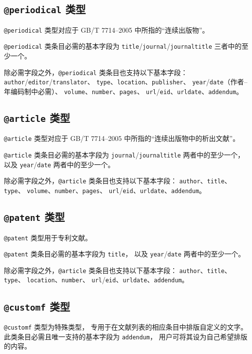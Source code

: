 \documentclass[UTF8]{ctexart}
\begin{document}
\subsection{\texttt{@periodical} 类型}

\verb|@periodical| 类型对应于 GB/T 7714--2005 中所指的“连续出版物”。

\verb|@periodical| 类条目必需的基本字段为
\verb|title|/\verb|journal|/\verb|journaltitle| 三者中的至少一个。

除必需字段之外，\verb|@periodical| 类条目也支持以下基本字段：%
\verb|author|/\verb|editor|/\verb|translator|、%
\verb|type|、\verb|location|、\verb|publisher|、%
\verb|year|/\verb|date|（作者--年编码制中必需）、%
\verb|volume|、\verb|number|、\verb|pages|、%
\verb|url|/\verb|eid|、\verb|urldate|、\verb|addendum|。

\subsection{\texttt{@article} 类型}

\verb|@article| 类型对应于 GB/T 7714--2005 中所指的“连续出版物中的析出文献”。

\verb|@article| 类条目必需的基本字段为
\verb|journal|/\verb|journaltitle| 两者中的至少一个，
以及 \verb|year|/\verb|date| 两者中的至少一个。

除必需字段之外，\verb|@article| 类条目也支持以下基本字段：%
\verb|author|、\verb|title|、\verb|type|、%
\verb|volume|、\verb|number|、\verb|pages|、%
\verb|url|/\verb|eid|、\verb|urldate|、\verb|addendum|。

\subsection{\texttt{@patent} 类型}

\verb|@patent| 类型用于专利文献。

\verb|@patent| 类条目必需的基本字段为 \verb|title|，
以及 \verb|year|/\verb|date| 两者中的至少一个。

除必需字段之外，\verb|@article| 类条目也支持以下基本字段：%
\verb|author|、\verb|title|、\verb|type|、%
\verb|location|、\verb|number|、%
\verb|url|/\verb|eid|、\verb|urldate|、\verb|addendum|。

\subsection{\texttt{@customf} 类型}

\verb|@customf| 类型为特殊类型，
专用于在文献列表的相应条目中排版自定义的文字。
此类条目必需且唯一支持的基本字段为 \verb|addendum|，
用户可将其设为自己希望排版的内容。
\end{document}
